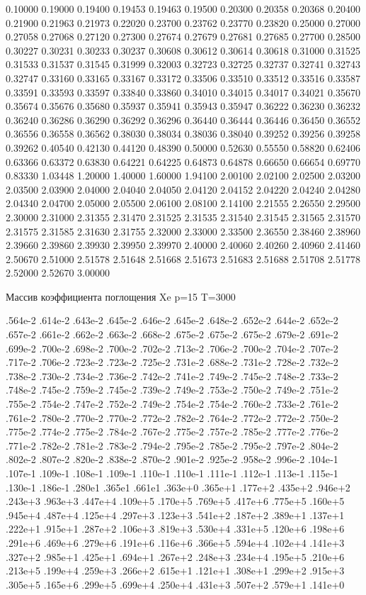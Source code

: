  0.10000 0.19000 0.19400 0.19453 0.19463 0.19500 0.20300 0.20358 0.20368 0.20400 0.21900 0.21963 0.21973 0.22020 0.23700 0.23762 0.23770 0.23820 0.25000 0.27000 0.27058 0.27068 0.27120 0.27300 0.27674 0.27679 0.27681 0.27685 0.27700 0.28500 0.30227 0.30231 0.30233 0.30237 0.30608 0.30612 0.30614 0.30618 0.31000 0.31525 0.31533 0.31537 0.31545 0.31999 0.32003 0.32723 0.32725 0.32737 0.32741 0.32743 0.32747 0.33160 0.33165 0.33167 0.33172 0.33506 0.33510 0.33512 0.33516 0.33587 0.33591 0.33593 0.33597 0.33840 0.33860 0.34010 0.34015 0.34017 0.34021 0.35670 0.35674 0.35676 0.35680 0.35937 0.35941 0.35943 0.35947 0.36222 0.36230 0.36232 0.36240 0.36286 0.36290 0.36292 0.36296 0.36440 0.36444 0.36446 0.36450 0.36552 0.36556 0.36558 0.36562 0.38030 0.38034 0.38036 0.38040 0.39252 0.39256 0.39258 0.39262 0.40540 0.42130 0.44120 0.48390 0.50000 0.52630 0.55550 0.58820 0.62406 0.63366 0.63372 0.63830 0.64221 0.64225 0.64873 0.64878 0.66650 0.66654 0.69770 0.83330 1.03448 1.20000 1.40000 1.60000 1.94100 2.00100 2.02100 2.02500 2.03200 2.03500 2.03900 2.04000 2.04040 2.04050 2.04120 2.04152 2.04220 2.04240 2.04280 2.04340 2.04700 2.05000 2.05500 2.06100 2.08100 2.14100 2.21555 2.26550 2.29500 2.30000 2.31000 2.31355 2.31470 2.31525 2.31535 2.31540 2.31545 2.31565 2.31570 2.31575 2.31585 2.31630 2.31755 2.32000 2.33000 2.33500 2.36550 2.38460 2.38960 2.39660 2.39860 2.39930 2.39950 2.39970 2.40000 2.40060 2.40260 2.40960 2.41460 2.50670 2.51000 2.51578 2.51648 2.51668 2.51673 2.51683 2.51688 2.51708 2.51778 2.52000 2.52670 3.00000

\noindent Массив коэффициента поглощения Xe p=15 T=3000

\noindent .564e-2 .614e‑2 .643e‑2 .645e‑2 .646e‑2 .645e‑2 .648e‑2 .652e‑2 .644e‑2 .652e‑2 .657e‑2 .661e‑2 .662e‑2 .663e‑2 .668e‑2 .675e‑2 .675e‑2 .675e‑2 .679e‑2 .691e‑2 .699e‑2 .700e‑2 .698e‑2 .700e‑2 .702e‑2 .713e‑2 .706e‑2 .700e‑2 .704e‑2 .707e‑2 .717e‑2 .706e‑2 .723e‑2 .723e‑2 .725e‑2 .731e‑2 .688e‑2 .731e‑2 .728e‑2 .732e‑2 .738e‑2 .730e‑2 .734e‑2 .736e‑2 .742e‑2 .741e‑2 .749e‑2 .745e‑2 .748e‑2 .733e‑2 .748e‑2 .745e‑2 .759e‑2 .745e‑2 .739e‑2 .749e‑2 .753e‑2 .750e‑2 .749e‑2 .751e‑2 .755e‑2 .754e‑2 .747e‑2 .752e‑2 .749e‑2 .754e‑2 .754e‑2 .760e‑2 .733e‑2 .761e‑2 .761e‑2 .780e‑2 .770e‑2 .770e‑2 .772e‑2 .782e‑2 .764e‑2 .772e‑2 .772e‑2 .750e‑2 .775e‑2 .774e‑2 .775e‑2 .784e‑2 .767e‑2 .775e‑2 .757e‑2 .785e‑2 .777e‑2 .776e‑2 .771e‑2 .782e‑2 .781e‑2 .783e‑2 .794e‑2 .795e‑2 .785e‑2 .795e‑2 .797e‑2 .804e‑2 .802e‑2 .807e‑2 .820e‑2 .838e‑2 .870e‑2 .901e‑2 .925e‑2 .958e‑2 .996e‑2 .104e‑1 .107e‑1 .109e‑1 .108e‑1 .109e‑1 .110e‑1 .110e‑1 .111e‑1 .112e‑1 .113e‑1 .115e‑1 .130e‑1 .186e‑1 .280e1 .365e1 .661e1 .363e+0 .365e+1 .177e+2 .435e+2 .946e+2 .243e+3 .963e+3 .447e+4 .109e+5 .170e+5 .769e+5 .417e+6 .775e+5 .160e+5 .945e+4 .487e+4 .125e+4 .297e+3 .123e+3 .541e+2 .187e+2 .389e+1 .137e+1 .222e+1 .915e+1 .287e+2 .106e+3 .819e+3 .530e+4 .331e+5 .120e+6 .198e+6 .291e+6 .469e+6 .279e+6 .191e+6 .116e+6 .366e+5 .594e+4 .102e+4 .141e+3 .327e+2 .985e+1 .425e+1 .694e+1 .267e+2 .248e+3 .234e+4 .195e+5 .210e+6 .213e+5 .199e+4 .259e+3 .266e+2 .615e+1 .121e+1 .308e+1 .299e+2 .915e+3 .305e+5 .165e+6 .299e+5 .699e+4 .250e+4 .431e+3 .507e+2 .579e+1 .141e+0

